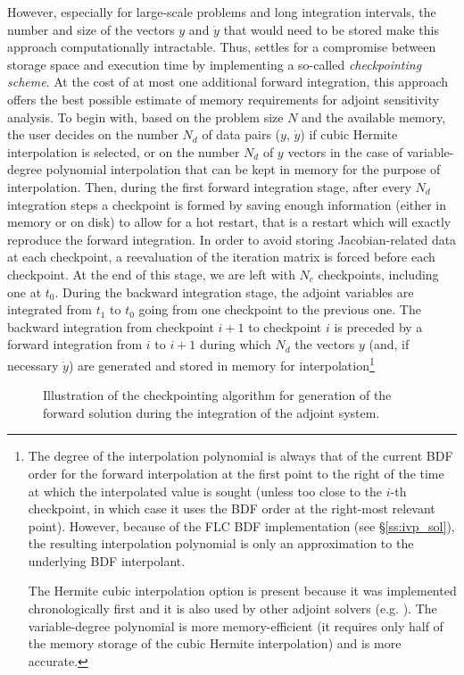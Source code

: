 However, especially for large-scale problems and long integration
intervals, the number and size of the vectors $y$ and ${\dot y}$ that would 
need to be stored make this approach computationally intractable. 
Thus, {\idas} settles for a compromise between storage space and execution time by
implementing a so-called {\em checkpointing scheme}. At the cost of at most one
additional forward integration, this approach offers the best possible estimate
of memory requirements for adjoint sensitivity analysis. To begin with, based on
the problem size $N$ and the available memory, the user decides on the number
$N_d$ of data pairs ($y$, ${\dot y}$) if cubic Hermite interpolation is selected, 
or on the number $N_d$ of $y$ vectors in the case of variable-degree polynomial
interpolation that can be kept in memory for the purpose of interpolation. 
Then, during the first forward integration stage, after
every $N_d$ integration steps a checkpoint is formed by saving enough information
(either in memory or on disk) to allow for a hot restart, that is a restart
which will exactly reproduce the forward integration. In order to avoid storing
Jacobian-related data at each checkpoint, a reevaluation of the iteration matrix
is forced before each checkpoint. At the end of this stage, we are left with $N_c$ 
checkpoints, including one at $t_0$.
During the backward integration stage, the adjoint variables are integrated
from $t_1$ to $t_0$ going from one checkpoint to the previous one.
The backward integration from checkpoint $i+1$ to checkpoint $i$ is preceded
by a forward integration from $i$ to $i+1$ during which $N_d$ the vectors 
$y$ (and, if necessary ${\dot y}$) are generated and stored in memory for 
interpolation\footnote{The degree of the 
interpolation polynomial is always that of the current BDF order for the forward
interpolation at the first point to the right of the time at which the interpolated
value is sought (unless too close to the $i$-th checkpoint, in which case it uses
the BDF order at the right-most relevant point). However, because of the FLC BDF
implementation (see \S\ref{ss:ivp_sol}), the resulting interpolation polynomial
is only an approximation to the underlying BDF interpolant.

The Hermite cubic interpolation option is present because it was implemented
chronologically first and it is also used by other adjoint solvers (e.g. {\daspkadjoint}).
The variable-degree polynomial is more memory-efficient (it requires only half of the
memory storage of the cubic Hermite interpolation) and is more accurate.}
%
\begin{figure}
\centerline{}
\caption {Illustration of the checkpointing algorithm for generation of 
  the forward solution during the integration of the adjoint system.}
\label{f:ckpnt}
\end{figure}

